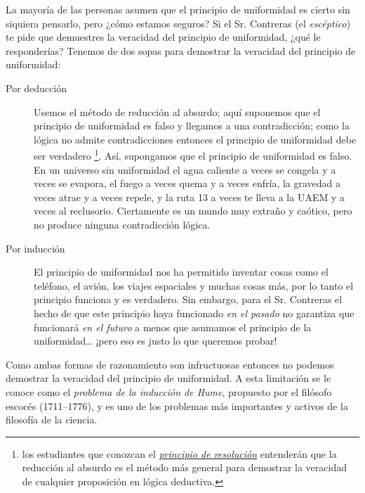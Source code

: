 La mayoría de las personas asumen que el principio de uniformidad es cierto
sin siquiera pensarlo, pero ¿cómo estamos seguros?
Si el Sr. Contreras (el \emph{escéptico}) te pide que demuestres la veracidad
del principio de uniformidad, ¿qué le responderías?
Tenemos de dos sopas para demostrar la veracidad del principio de uniformidad:
\begin{description}
    \item[Por deducción] Usemos el método de reducción al absurdo; aquí
        suponemos que el principio de uniformidad es falso y llegamos a una
        contradicción; como la lógica no admite contradicciones entonces el
        principio de uniformidad debe ser verdadero%
        \footnote{%
            los estudiantes que conozcan el
            \href{http://intrologic.stanford.edu/extras/resolution.html}%
            {\emph{principio de resolución}} entenderán que la reducción al
            absurdo es el método más general para demostrar la veracidad de
            cualquier proposición en lógica deductiva.
        }.
        Así, supongamos que el principio de uniformidad es falso.
        En un universo sin uniformidad el agua caliente a veces se congela y a
        veces se evapora, el fuego a veces quema y a veces enfría, la gravedad
        a veces atrae y a veces repele, y la ruta 13 a veces te lleva a la UAEM
        y a veces al reclusorio.
        Ciertamente es un mundo muy extraño y caótico, pero no produce ninguna
        contradicción lógica.
    \item[Por inducción] El principio de uniformidad nos ha permitido inventar
        cosas como el teléfono, el avión, los viajes espaciales y muchas cosas
        más, por lo tanto el principio funciona y es verdadero.
        Sin embargo, para el Sr. Contreras el hecho de que este principio haya
        funcionado \emph{en el pasado} no garantiza que funcionará \emph{en el
            futuro} a menos que asumamos el principio de la uniformidad… ¡pero
        eso es justo lo que queremos probar!
\end{description}
Como ambas formas de razonamiento son infructuosas entonces no podemos demostrar
la veracidad del principio de uniformidad.
A esta limitación se le conoce como el \emph{problema de la inducción de Hume},
propuesto por el filósofo escocés  (1711--1776),
y es uno de los problemas más importantes y activos de la filosofía de la
ciencia.

